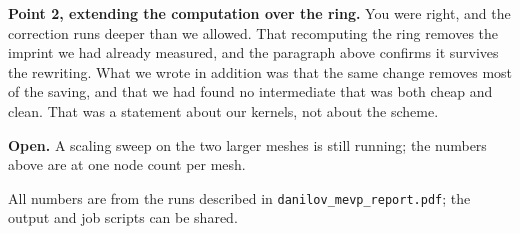 \documentclass[10pt,a4paper]{article}
\begin{document}
\textbf{Point 2, extending the computation over the ring.} You were right, and the correction runs
deeper than we allowed. That recomputing the ring removes the imprint we had already measured, and
the paragraph above confirms it survives the rewriting. What we wrote in addition was that the
same change removes most of the saving, and that we had found no intermediate that was both cheap
and clean. That was a statement about our kernels, not about the scheme.

\textbf{Open.} A scaling sweep on the two larger meshes is still running; the numbers above are at
one node count per mesh.

\vspace{0.35em}
{\footnotesize All numbers are from the runs described in \texttt{danilov\_mevp\_report.pdf}; the
output and job scripts can be shared.}
\end{document}

